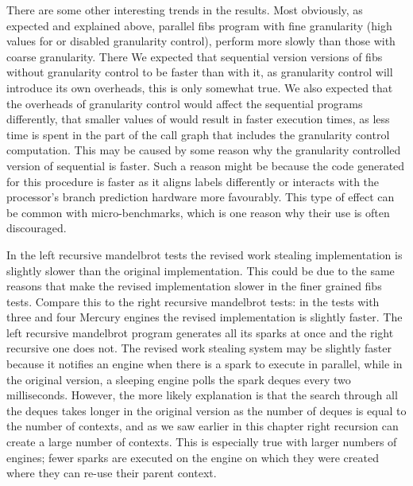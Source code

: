 There are some other interesting trends in the results.
Most obviously,
as expected and explained above,
parallel fibs program with fine granularity
(high values for \Depth or disabled granularity control),
perform more slowly than those with coarse granularity.
There
We expected that sequential version versions of fibs without granularity
control to be faster than with it,
as granularity control will introduce its own overheads, this is only
somewhat true.
We also expected that the overheads of granularity control would affect the
sequential programs differently,
that smaller values of \Depth would result in faster execution times,
as less time is spent in the part of the call graph that includes the
granularity control computation.
This may be caused by some reason why the granularity controlled version of
sequential \fibs is faster.
Such a reason might be because the code generated for this procedure is
faster as it aligns labels differently or interacts with the processor's
branch prediction hardware more favourably.
This type of effect can be common with micro-benchmarks,
which is one reason why their use is often discouraged.

In the left recursive mandelbrot tests the revised work stealing
implementation is slightly slower than the original implementation.
This could be due to the same reasons that make the revised implementation
slower in the finer grained fibs tests.
Compare this to the right recursive mandelbrot tests:
in the tests with three and four Mercury engines the revised implementation
is slightly faster.
The left recursive mandelbrot program generates all its
sparks at once and the right recursive one does not.
The revised work stealing system may be slightly faster because it
notifies an engine when there is a spark to execute in parallel,
while in the original version, a sleeping engine polls the spark deques
every two milliseconds.
However, the more likely explanation is that the search through all the
deques takes longer in the original version as the number of deques is equal
to the number of contexts,
and as we saw earlier in this chapter right recursion can create a large
number of contexts.
This is especially true with larger numbers of engines;
fewer sparks are executed on the engine on which they were created where
they can re-use their parent context.

